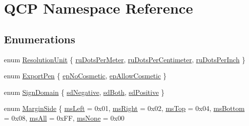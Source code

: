 \hypertarget{namespaceQCP}{}\section{Q\+CP Namespace Reference}
\label{namespaceQCP}
\subsection*{Enumerations}
\begin{DoxyCompactItemize}
\item 
enum \hyperlink{namespaceQCP_a715d46153da230990aa887d0f0602452}{Resolution\+Unit} \{ \hyperlink{namespaceQCP_a715d46153da230990aa887d0f0602452a707d005dea5c4ab694e4270d9c6094e8}{ru\+Dots\+Per\+Meter}, 
\hyperlink{namespaceQCP_a715d46153da230990aa887d0f0602452a4224e01f49b331489ad8cb12b619b229}{ru\+Dots\+Per\+Centimeter}, 
\hyperlink{namespaceQCP_a715d46153da230990aa887d0f0602452affb887d8efe79c39a1aca2acd7002afc}{ru\+Dots\+Per\+Inch}
 \}
\item 
enum \hyperlink{namespaceQCP_a17844f19e1019693a953e1eb93536d2f}{Export\+Pen} \{ \hyperlink{namespaceQCP_a17844f19e1019693a953e1eb93536d2faae8fcfaafee234ce18558afef83f6a78}{ep\+No\+Cosmetic}, 
\hyperlink{namespaceQCP_a17844f19e1019693a953e1eb93536d2fa50d3657dba3fb90560b93a823cb0a6e8}{ep\+Allow\+Cosmetic}
 \}
\item 
enum \hyperlink{namespaceQCP_afd50e7cf431af385614987d8553ff8a9}{Sign\+Domain} \{ \hyperlink{namespaceQCP_afd50e7cf431af385614987d8553ff8a9a2d18af0bc58f6528d1e82ce699fe4829}{sd\+Negative}, 
\hyperlink{namespaceQCP_afd50e7cf431af385614987d8553ff8a9aa38352ef02d51ddfa4399d9551566e24}{sd\+Both}, 
\hyperlink{namespaceQCP_afd50e7cf431af385614987d8553ff8a9a584784b75fb816abcc627cf743bb699f}{sd\+Positive}
 \}
\item 
enum \hyperlink{namespaceQCP_a7e487e3e2ccb62ab7771065bab7cae54}{Margin\+Side} \{ \newline
\hyperlink{namespaceQCP_a7e487e3e2ccb62ab7771065bab7cae54a9500c8bfcc9e80b9dff0a8e00e867f07}{ms\+Left} = 0x01, 
\hyperlink{namespaceQCP_a7e487e3e2ccb62ab7771065bab7cae54a93c719593bb2b94ed244d52c86d83b65}{ms\+Right} = 0x02, 
\hyperlink{namespaceQCP_a7e487e3e2ccb62ab7771065bab7cae54a5db8fb0d0b0ecf0d611c2602a348e8a0}{ms\+Top} = 0x04, 
\hyperlink{namespaceQCP_a7e487e3e2ccb62ab7771065bab7cae54a5241d8eac2bab9524a38889f576179cc}{ms\+Bottom} = 0x08, 
\newline
\hyperlink{namespaceQCP_a7e487e3e2ccb62ab7771065bab7cae54a43d7361cb0c5244eabdc962021bffebc}{ms\+All} = 0x\+FF, 
\hyperlink{namespaceQCP_a7e487e3e2ccb62ab7771065bab7cae54a80aa4149f16dabd538f8b2e3d42c42d5}{ms\+None} = 0x00

\end{DoxyCompactItemize}
